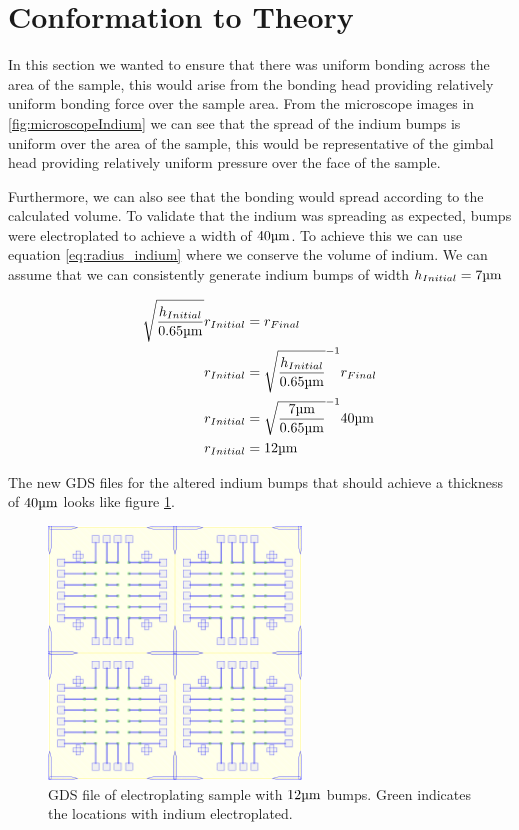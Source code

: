 \section{Conformation to Theory}
In this section we wanted to ensure that there was uniform bonding across the area of the sample, this would arise from the bonding head providing relatively uniform bonding force over the sample area. From the microscope images in \ref{fig:microscopeIndium} we can see that the spread of the indium bumps is uniform over the area of the sample, this would be representative of the gimbal head providing relatively uniform pressure over the face of the sample.

Furthermore, we can also see that the bonding would spread according to the calculated volume.
To validate that the indium was spreading as expected, bumps were electroplated to achieve a width of $40 \um$. To achieve this we can use equation \ref{eq:radius_indium} where we conserve the volume of indium. We can assume that we can consistently generate indium bumps of width $h_{Initial} = 7\um$


\begin{equation} \label{eq:initial_radius}
    \begin{split}
        \sqrt{\frac{h_{Initial}}{ 0.65 \um}} r_{Initial} &= r_{Final} \\
        r_{Initial} &= \sqrt{\frac{h_{Initial}}{ 0.65 \um}}^{-1}r_{Final} \\
        r_{Initial} &= \sqrt{\frac{7 \um}{ 0.65 \um}}^{-1} 40 \um \\
        r_{Initial} &= 12 \um
    \end{split}
\end{equation}

The new GDS files for the altered indium bumps that should achieve a thickness of $40 \um$ looks like figure \ref{fig:12um_bumps_gds}.


\begin{figure}
    \centering
    \includegraphics[width=0.6\textwidth]{Main/Ch2/DC_DieBTest_V212um_tex_output.pdf}
    \caption{GDS file of electroplating sample with $12\um$ bumps. Green indicates the locations with indium electroplated. }
    \label{fig:12um_bumps_gds}
\end{figure}

